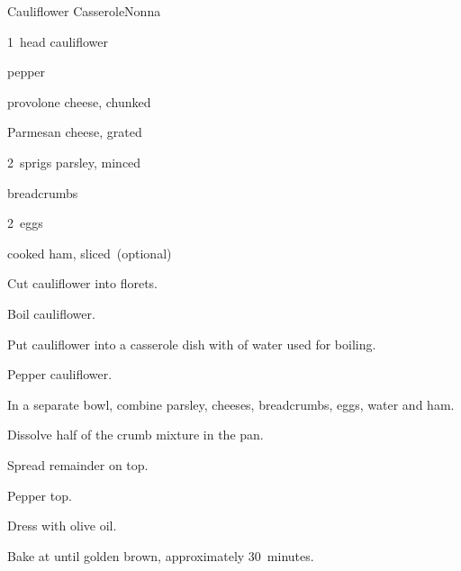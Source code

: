 \begin{recipe}{Cauliflower Casserole}{Nonna}{}

\begin{ingredients}
\item 1~head cauliflower
\item pepper
\item \C{\half} provolone cheese, chunked
\item \C{\half} Parmesan cheese, grated
\item 2~sprigs parsley, minced
\item \C{\threequarter} breadcrumbs
\item 2~eggs
\item \C{\quarter} cooked ham, sliced~(optional)
\end{ingredients}

\begin{directions}
\item Cut cauliflower into florets.
\item Boil cauliflower.
\item Put cauliflower into a casserole dish with  of water used for boiling.
\item Pepper cauliflower.
\item In a separate bowl, combine parsley, cheeses, breadcrumbs, eggs, \C{\quarter} water and ham.
\item Dissolve half of the crumb mixture in the pan.
\item Spread remainder on top.
\item Pepper top.
\item Dress with olive oil.
\item Bake at  until golden brown, approximately 30~minutes.
\end{directions}

\end{recipe}
